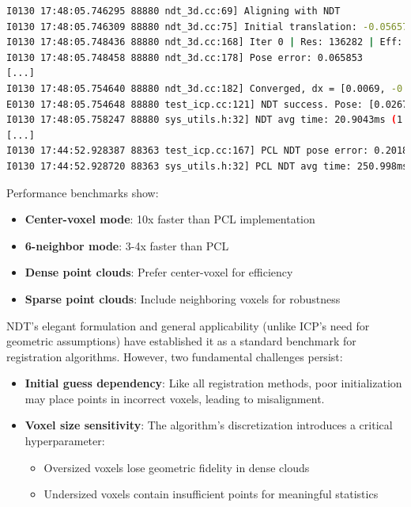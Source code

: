 \begin{lstlisting}[language=sh,caption=Terminal output:]
I0130 17:48:05.746295 88880 ndt_3d.cc:69] Aligning with NDT
I0130 17:48:05.746309 88880 ndt_3d.cc:75] Initial translation: -0.0565748 -0.122053 0.0288451
I0130 17:48:05.748436 88880 ndt_3d.cc:168] Iter 0 | Res: 136282 | Eff: 44120 | Avg: 3.0889 | dx: 0.0323 [0.0212, -0.0005, -0.0209, -0.0078, 0.0069, -0.0071]
I0130 17:48:05.748458 88880 ndt_3d.cc:178] Pose error: 0.065853
[...]
I0130 17:48:05.754640 88880 ndt_3d.cc:182] Converged, dx = [0.0069, -0.0035, -0.0049, -0.0005, 0.0021, -0.0031]
E0130 17:48:05.754648 88880 test_icp.cc:121] NDT success. Pose: [0.0267, -0.0049, -0.0222, 0.9994], [-0.0713, -0.1045, 0.0086]
I0130 17:48:05.758247 88880 sys_utils.h:32] NDT avg time: 20.9043ms (1 runs)
[...]
I0130 17:44:52.928387 88363 test_icp.cc:167] PCL NDT pose error: 0.201841
I0130 17:44:52.928720 88363 sys_utils.h:32] PCL NDT avg time: 250.998ms (1 runs)
\end{lstlisting}

Performance benchmarks show:
\begin{itemize}
	\item \textbf{Center-voxel mode}: 10x faster than PCL implementation
	\item \textbf{6-neighbor mode}: 3-4x faster than PCL
	\item \textbf{Dense point clouds}: Prefer center-voxel for efficiency
	\item \textbf{Sparse point clouds}: Include neighboring voxels for robustness
\end{itemize}

NDT's elegant formulation and general applicability (unlike ICP's need for geometric assumptions) have established it as a standard benchmark for registration algorithms. However, two fundamental challenges persist:

\begin{itemize}
	\item \textbf{Initial guess dependency}: Like all registration methods, poor initialization may place points in incorrect voxels, leading to misalignment.
	\item \textbf{Voxel size sensitivity}: The algorithm's discretization introduces a critical hyperparameter:
	\begin{itemize}
		\item Oversized voxels lose geometric fidelity in dense clouds
		\item Undersized voxels contain insufficient points for meaningful statistics
	\end{itemize}
\end{itemize}

